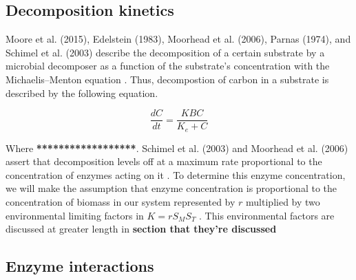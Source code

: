 \documentclass[12pt]{article}
\begin{document}
\begin{multicols}{2}
\subsection{Decomposition kinetics}
Moore et al. (2015), Edelstein (1983), Moorhead et al. (2006), Parnas (1974), and Schimel et al. (2003) describe the decomposition of a certain substrate by a microbial decomposer as a function of the substrate's concentration with the Michaelis–Menton equation \cite{Moore2015, Edelstein1983, Moorhead2006, Parnas1975, Schimel2003}. Thus, decompostion of carbon in a substrate is described by the following equation.

\begin{equation} \label{eq:3}
\frac{dC}{dt} = \frac{KBC}{K_{e}+C}
\end{equation}

Where \textbf{******************}. Schimel et al. (2003) and Moorhead et al. (2006) assert that decomposition levels off at a maximum rate proportional to the concentration of enzymes acting on it \cite{Schimel2003, Moorhead2006}. To determine this enzyme concentration, we will make the assumption that enzyme concentration is proportional to the concentration of biomass in our system represented by $r$ multiplied by two environmental limiting factors in $K=rS_{M}S_{T}$ \cite{Schimel2003}. This environmental factors are discussed at greater length in \textbf{section that they're discussed}

\subsection{Enzyme interactions}


\end{multicols}
\end{document}
